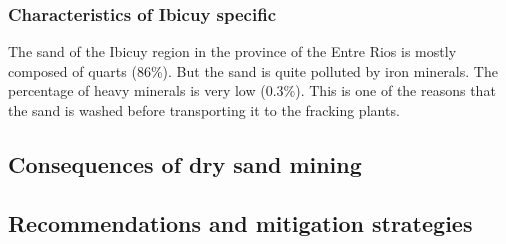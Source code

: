 \subsubsection{Characteristics of Ibicuy specific}

The sand of the Ibicuy region in the province of the Entre Rios is mostly composed of quarts (86\%). But the sand is quite polluted by iron minerals. The percentage of heavy minerals is very low (0.3\%). This is one of the reasons that the sand is washed before transporting it to the fracking plants. 

\subsection{Consequences of dry sand mining}


\subsection{Recommendations and mitigation strategies}
